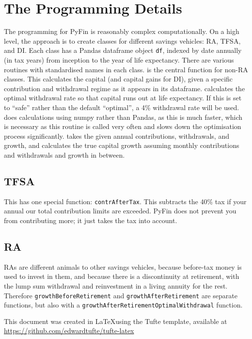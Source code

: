 \documentclass[a4paper, justified]{tufte-handout}
\begin{document}
\section{The Programming Details}
The programming for PyFin is reasonably complex computationally. On a high level, the approach is to create classes for different savings vehicles: RA, TFSA, and DI. Each class has a Pandas dataframe object \texttt{df}, indexed by date annually (in tax years) from inception to the year of life expectancy. There are various routines with standardised names in each class.
 is the central function for non-RA classes. This calculates the capital (and capital gains for DI), given a specific contribution and withdrawal regime as it appears in its dataframe.
 calculates the optimal withdrawal rate so that capital runs out at life expectancy. If this is set to ``safe'' rather than the default ``optimal'', a 4\% withdrawal rate will be used.
 does calculations using numpy rather than Pandas, as this is much faster, which is necessary as this routine is called very often and slows down the optimisation process significantly.
 takes the given annual contributions, withdrawals, and growth, and calculates the true capital growth assuming monthly contributions and withdrawals and growth in between.

\subsection{TFSA} This has one special function: \texttt{contrAfterTax}. This subtracts the 40\% tax if your annual our total contribution limits are exceeded. PyFin does not prevent you from contributing more; it just takes the tax into account. 

\subsection{RA} RAs are different animals to other savings vehicles, because before-tax money is used to invest in them, and because there is a discontinuity at retirement, with the lump sum withdrawal and reinvestment in a living annuity for the rest. Therefore \texttt{growthBeforeRetirement} and \texttt{growthAfterRetirement} are separate functions, but also with a \texttt{growthAfterRetirementOptimalWithdrawal} function. 

\bigskip
This document was created in \LaTeX using the Tufte template, available at \url{https://github.com/edwardtufte/tufte-latex}
\end{document}
